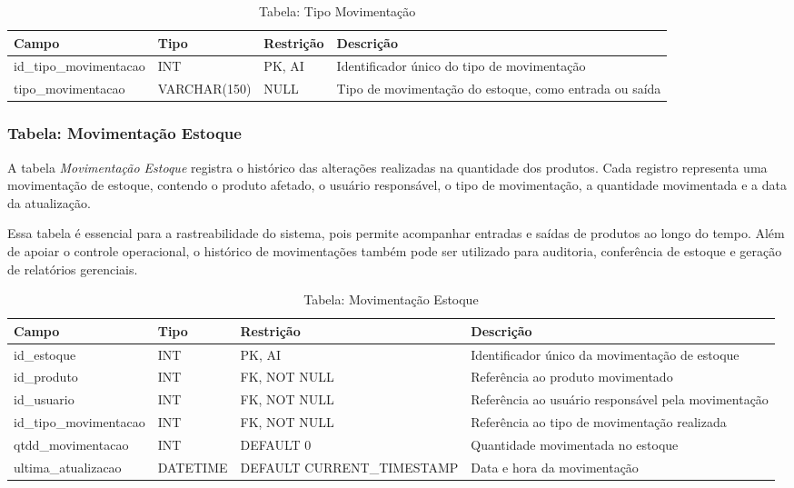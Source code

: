 \begin{table}[H]
\centering
\begin{tabular}{|p{3cm}|p{3cm}|p{3cm}|p{5cm}|}
\hline
\textbf{Campo} & \textbf{Tipo} & \textbf{Restrição} & \textbf{Descrição} \\ \hline
id\_tipo\_movimentacao & INT & PK, AI & Identificador único do tipo de movimentação \\ \hline
tipo\_movimentacao & VARCHAR(150) & NULL & Tipo de movimentação do estoque, como entrada ou saída \\ \hline
\end{tabular}
\caption{Tabela: Tipo Movimentação}
\end{table}

\subsubsection{Tabela: Movimentação Estoque}

A tabela \textit{Movimentação Estoque} registra o histórico das alterações realizadas na quantidade dos produtos. Cada registro representa uma movimentação de estoque, contendo o produto afetado, o usuário responsável, o tipo de movimentação, a quantidade movimentada e a data da atualização.

Essa tabela é essencial para a rastreabilidade do sistema, pois permite acompanhar entradas e saídas de produtos ao longo do tempo. Além de apoiar o controle operacional, o histórico de movimentações também pode ser utilizado para auditoria, conferência de estoque e geração de relatórios gerenciais.

\begin{table}[H]
\centering
\begin{tabular}{|p{3cm}|p{3cm}|p{3cm}|p{5cm}|}
\hline
\textbf{Campo} & \textbf{Tipo} & \textbf{Restrição} & \textbf{Descrição} \\ \hline
id\_estoque & INT & PK, AI & Identificador único da movimentação de estoque \\ \hline
id\_produto & INT & FK, NOT NULL & Referência ao produto movimentado \\ \hline
id\_usuario & INT & FK, NOT NULL & Referência ao usuário responsável pela movimentação \\ \hline
id\_tipo\_movimentacao & INT & FK, NOT NULL & Referência ao tipo de movimentação realizada \\ \hline
qtdd\_movimentacao & INT & DEFAULT 0 & Quantidade movimentada no estoque \\ \hline
ultima\_atualizacao & DATETIME & DEFAULT CURRENT\_TIMESTAMP & Data e hora da movimentação \\ \hline
\end{tabular}
\caption{Tabela: Movimentação Estoque}
\end{table}

